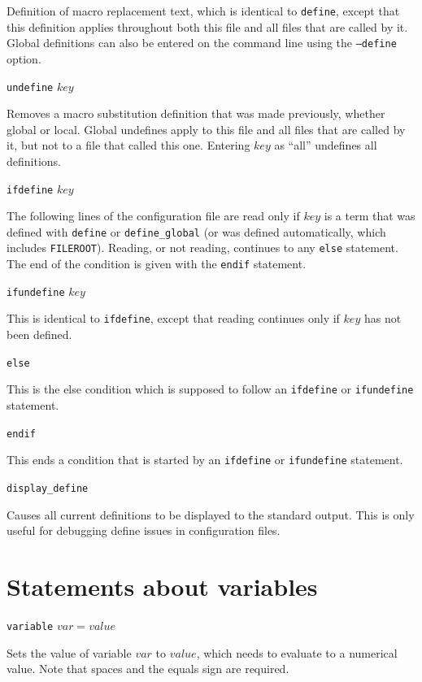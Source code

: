 \documentclass {scrbook}
\newcommand {\ttt} {\texttt}
\begin{document}
\begin{description}
Definition of macro replacement text, which is identical to \ttt{define}, except that this definition applies throughout both this file and all files that are called by it. Global definitions can also be entered on the command line using the \ttt{--define} option.

\item{\ttt{undefine} $key$}

Removes a macro substitution definition that was made previously, whether global or local. Global undefines apply to this file and all files that are called by it, but not to a file that called this one. Entering $key$ as ``all'' undefines all definitions.

\item{\ttt{ifdefine} $key$}

The following lines of the configuration file are read only if $key$ is a term that was defined with \ttt{define} or \ttt{define\_global} (or was defined automatically, which includes \ttt{FILEROOT}). Reading, or not reading, continues to any \ttt{else} statement. The end of the condition is given with the \ttt{endif} statement.

\item{\ttt{ifundefine} $key$}

This is identical to \ttt{ifdefine}, except that reading continues only if $key$ has not been defined.

\item{\ttt{else}}

This is the else condition which is supposed to follow an \ttt{ifdefine} or \ttt{ifundefine} statement.

\item{\ttt{endif}}

This ends a condition that is started by an \ttt{ifdefine} or \ttt{ifundefine} statement.

\item{\ttt{display\_define}}

Causes all current definitions to be displayed to the standard output. This is only useful for debugging define issues in configuration files.

\end{description}

\section{Statements about variables}

\begin{description}

\item{\ttt{variable} $var = value$}

Sets the value of variable $var$ to $value$, which needs to evaluate to a numerical value. Note that spaces and the equals sign are required.

\end{description}
\end{document}
